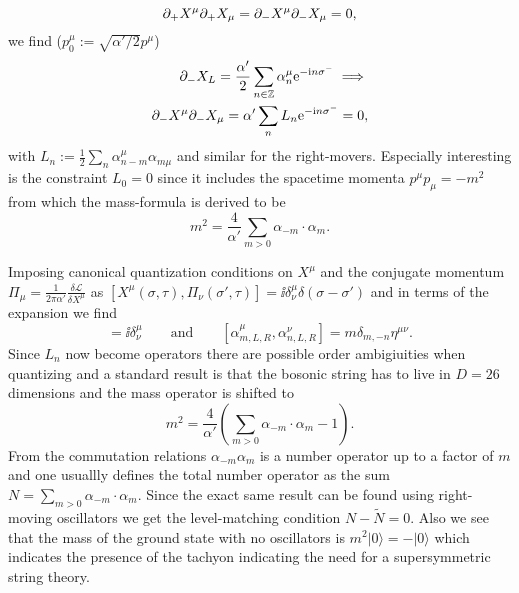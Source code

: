 \begin{equation}
    \partial_+X^\mu\partial_+X_\mu =\partial_-X^\mu\partial_-X_\mu = 0,
\end{equation}
we find ($p_0^\mu:= \sqrt{\alpha'/2}p^\mu$)
\begin{equation}
    \begin{aligned}
    \partial_-X_L = \frac{\alpha'}{2}\sum_{n\in\mathbb{Z}}\alpha_{n}^\mu \mathrm{e}^{-\mathrm{i} n\sigma^-}\implies\\
    \partial_-X^\mu\partial_-X_\mu = \alpha'\sum_nL_n \mathrm{e}^{-\mathrm{i} n\sigma^-}=0,
    \end{aligned}
\end{equation}
with $L_n:=\frac{1}{2}\sum_n \alpha_{n-m}^\mu\alpha_{m\mu}$ and similar for the right-movers. Especially interesting is the constraint $L_0=0$ since it includes the spacetime momenta $p^\mu p_\mu=-m^2$ from which the mass-formula is derived to be
\begin{equation}
    m^2 = \frac{4}{\alpha'}\sum_{m>0}\alpha_{-m}\cdot \alpha_{m}.
\end{equation}

Imposing canonical quantization conditions on $X^\mu$ and the conjugate momentum $\Pi_\mu=\frac{1}{2\pi\alpha'}\frac{\delta \mathcal{L}}{\delta X^\mu}$ as $[X^\mu(\sigma,\tau),\Pi_\nu(\sigma',\tau)] = \ii \delta^\mu_\nu\delta(\sigma-\sigma')$ and in terms of the expansion we find 
\begin{equation}
    [x^\mu,p_\nu] = \ii \delta^\mu_\nu \qquad \text{and}\qquad [\alpha^\mu_{m,L,R},\alpha^\nu_{n,L,R}] = m\delta_{m,-n}\eta^{\mu\nu}.
\end{equation}
Since $L_n$ now become operators there are possible order ambigiuities when quantizing and a standard result is that the bosonic string has to live in $D=26$ dimensions and the mass operator is shifted to 
\begin{equation}
    m^2 = \frac{4}{\alpha'}\left(\sum_{m>0}\alpha_{-m}\cdot \alpha_{m}-1\right).
\end{equation}
From the commutation relations $\alpha_{-m}\alpha_{m}$ is a number operator up to a factor of $m$ and one usuallly defines the total number operator as the sum $N=\sum_{m>0}\alpha_{-m}\cdot \alpha_{m}$. Since the exact same result can be found using right-moving oscillators we get the level-matching condition $N-\tilde{N}=0$.  Also we see that the mass of the ground state with no oscillators is $m^2|0\rangle=-|0\rangle$ which indicates the presence of the tachyon indicating the need for a supersymmetric string theory. 

